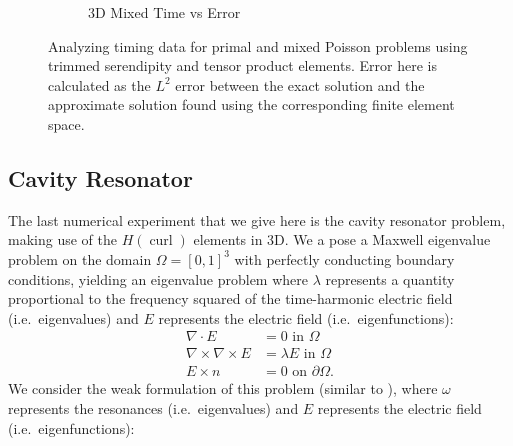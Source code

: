 \documentclass[format=acmsmall,screen,timestamp=false,a4paper]{acmart}
\DeclareMathOperator{\curl}{curl}
\newcommand{\hcurl}{\ensuremath{{H}(\curl)}\xspace}
\begin{document}
\begin{figure}[htbp]
\begin{subfigure}[h]{0.48\textwidth}
    \caption{3D Mixed Time vs Error \label{fig:3dMixedTimeError}}
  \end{subfigure}
  \caption{Analyzing timing data for primal and mixed Poisson problems using trimmed serendipity and tensor product elements.  Error here is calculated as the $L^2$ error between the exact solution and the approximate solution found using the corresponding finite element space.}
\label{fig:PrimalMixedTimeAnalysis}
\end{figure}

\subsection{Cavity Resonator}

The last numerical experiment that we give here is the cavity resonator problem, making use of the \hcurl elements in 3D.  We a pose a Maxwell eigenvalue problem on the domain $\Omega = [0,1]^3$ with perfectly conducting boundary conditions, yielding an eigenvalue problem where $\lambda$ represents a quantity proportional to the frequency squared of the time-harmonic electric field (i.e.\ eigenvalues) and $E$ represents the electric field (i.e.\ eigenfunctions):
\begin{align*}
    \nabla \cdot E &= 0 \text{ in } \Omega \\
    \nabla \times \nabla \times E &= \lambda E  \text{ in } \Omega \\
    E \times n &= 0 \text{ on } \partial \Omega.
\end{align*}
We consider the weak formulation of this problem (similar to \cite{fumio1987mixed}), where $\omega$ represents the resonances (i.e.\ eigenvalues) and $E$ represents the electric field (i.e.\ eigenfunctions):
\end{document}
